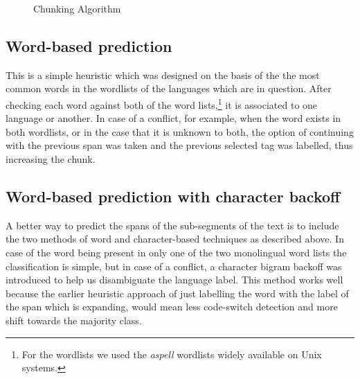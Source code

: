 \documentclass[11pt]{article}
\begin{document}
\vspace{-0.4cm}
\begin{figure}[hb]
\def\@fs@post{}
\caption{Chunking Algorithm}
\label{fig:chunkal}
\end{figure}

\vspace{-0.8cm}
\subsection{Word-based prediction}
\label{wbased}

This is a simple heuristic which was designed on the basis of the the most common words in the wordlists of the languages 
which are in question. After checking each word against both of the word lists,\footnote{For the wordlists we used the \emph{aspell}
wordlists widely available on Unix systems.} it is associated to one language or another. In 
case of a conflict, for example, when the word exists in both wordlists, or in the case that it is unknown to both, the option 
of continuing with the previous span was taken and the previous selected tag was labelled, thus increasing the chunk. 

\subsection{Word-based prediction with character backoff}
\label{wbasedbackoff}

A better way to predict the spans of the sub-segments of the text is to include the two methods of word and character-based techniques 
as described above. In case of the word being present in only one of the two monolingual word lists the classification is simple, 
but in case of a conflict, a character bigram backoff was introduced to help us disambiguate the language label. This method works well because the earlier heuristic approach of just labelling the word with the label of the span which is expanding, would mean less code-switch detection and more shift towards the majority class. 
\end{document}
